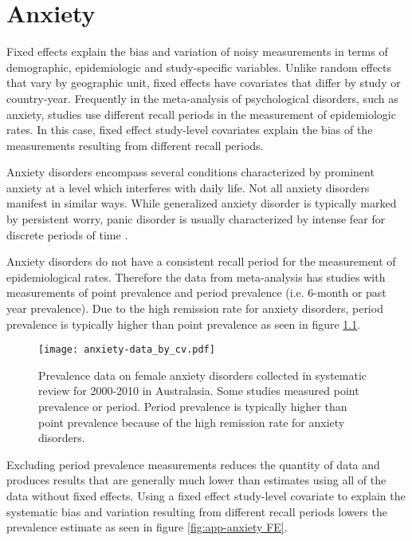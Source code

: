 \chapter{Anxiety}
\label{applications-efx_study_level}

Fixed effects explain the bias and variation of noisy measurements in terms of demographic, epidemiologic and study-specific variables.  Unlike random effects that vary by geographic unit, fixed effects have covariates that differ by study or country-year.  Frequently in the meta-analysis of psychological disorders, such as anxiety, studies use different recall periods in the measurement of epidemiologic rates.  In this case, fixed effect study-level covariates explain the bias of the measurements resulting from different recall periods.

Anxiety disorders encompass several conditions characterized by prominent anxiety at a level which interferes with daily life.  Not all anxiety disorders manifest in similar ways.  While generalized anxiety disorder is typically marked by persistent worry, panic disorder is usually characterized by intense fear for discrete periods of time \cite{american_diagnostic_2000}.

Anxiety disorders do not have a consistent recall period for the measurement of epidemiological rates.  Therefore the data from meta-analysis has studies with measurements of point prevalence and period prevalence (i.e. 6-month or past year prevalence).  Due to the high remission rate for anxiety disorders, period prevalence is typically higher than point prevalence as seen in figure \ref{fig:app-anxiety data}.

    \begin{figure}[h]
        \begin{center}
            \texttt{[image: anxiety-data\_by\_cv.pdf]}
            \caption{Prevalence data on female anxiety disorders collected in systematic review for 2000-2010 in Australasia.  Some studies measured point prevalence or period.  Period prevalence is typically higher than point prevalence because of the high remission rate for anxiety disorders.}
            \label{fig:app-anxiety data}
        \end{center}
    \end{figure}

Excluding period prevalence measurements reduces the quantity of data and produces results that are generally much lower than estimates using all of the data without fixed effects.  Using a fixed effect study-level covariate to explain the systematic bias and variation resulting from different recall periods lowers the prevalence estimate as seen in figure \ref{fig:app-anxiety FE}.

